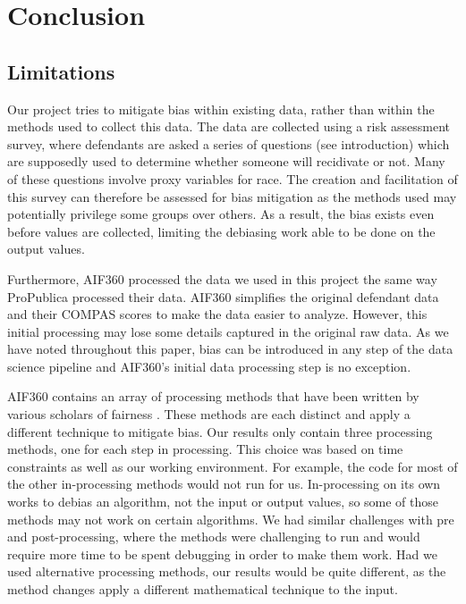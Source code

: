 \documentclass[water,article,submit,moreauthors,pdftex]{mdpi}
\begin{document}
\hypertarget{conclusion}{%
\section{Conclusion}\label{conclusion}}

\hypertarget{limitations}{%
\subsection{Limitations}\label{limitations}}

Our project tries to mitigate bias within existing data, rather than
within the methods used to collect this data. The data are collected
using a risk assessment survey, where defendants are asked a series of
questions (see introduction) which are supposedly used to determine
whether someone will recidivate or not. Many of these questions involve
proxy variables for race. The creation and facilitation of this survey
can therefore be assessed for bias mitigation as the methods used may
potentially privilege some groups over others. As a result, the bias
exists even before values are collected, limiting the debiasing work
able to be done on the output values.

Furthermore, AIF360 processed the data we used in this project the same
way ProPublica processed their data. AIF360 simplifies the original
defendant data and their COMPAS scores to make the data easier to
analyze. However, this initial processing may lose some details captured
in the original raw data. As we have noted throughout this paper, bias
can be introduced in any step of the data science pipeline and AIF360's
initial data processing step is no exception.

AIF360 contains an array of processing methods that have been written by
various scholars of fairness \citep{aif360-oct-2018}. These methods are
each distinct and apply a different technique to mitigate bias. Our
results only contain three processing methods, one for each step in
processing. This choice was based on time constraints as well as our
working environment. For example, the code for most of the other
in-processing methods would not run for us. In-processing on its own
works to debias an algorithm, not the input or output values, so some of
those methods may not work on certain algorithms. We had similar
challenges with pre and post-processing, where the methods were
challenging to run and would require more time to be spent debugging in
order to make them work. Had we used alternative processing methods, our
results would be quite different, as the method changes apply a
different mathematical technique to the input.
\end{document}
